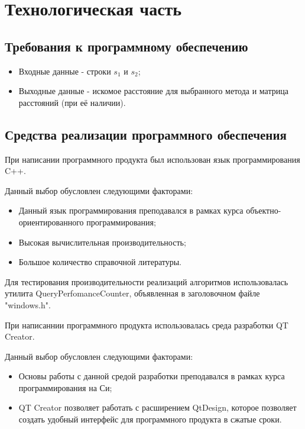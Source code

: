 \documentclass[12pt]{report}
\begin{document}
\chapter{Технологическая часть}
\section{Требования к программному обеспечению}
\begin{itemize}
\item Входные данные - строки $s_{1}$ и $s_{2}$;
\item Выходные данные - искомое расстояние для выбранного метода и матрица расстояний (при её наличии).
\end{itemize}
\section{Средства реализации программного обеспечения}
При написании программного продукта был использован язык программирования C++.

Данный выбор обусловлен следующими факторами:
\begin{itemize}
\item Данный язык программирования преподавался в рамках курса объектно-ориентированного программирования;
\item Высокая вычислительная производительность;
\item Большое количество справочной литературы.
\end{itemize}

Для тестирования производительности реализаций алгоритмов использовалась утилита QueryPerfomanceCounter, объявленная в заголовочном файле "windows.h".

При написаннии программного продукта использовалась среда разработки QT Creator.

Данный выбор обусловлен следующими факторами:
\begin{itemize}
\item Основы работы с данной средой разработки преподавался в рамках курса программирования на Си;
\item QT Creator позволяет работать с расширением QtDesign, которое позволяет создать удобный интерфейс для программного продукта в сжатые сроки.
\end{itemize}
\end{document}
